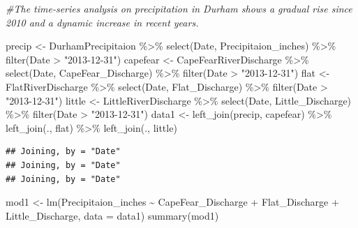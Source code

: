 \documentclass[
  12pt,
]{article}
\newenvironment{Shaded}{\begin{snugshade}}{\end{snugshade}}
\newcommand{\AttributeTok}[1]{\textcolor[rgb]{0.77,0.63,0.00}{#1}}
\newcommand{\CommentTok}[1]{\textcolor[rgb]{0.56,0.35,0.01}{\textit{#1}}}
\newcommand{\FunctionTok}[1]{\textcolor[rgb]{0.00,0.00,0.00}{#1}}
\newcommand{\NormalTok}[1]{#1}
\newcommand{\OtherTok}[1]{\textcolor[rgb]{0.56,0.35,0.01}{#1}}
\newcommand{\SpecialCharTok}[1]{\textcolor[rgb]{0.00,0.00,0.00}{#1}}
\newcommand{\StringTok}[1]{\textcolor[rgb]{0.31,0.60,0.02}{#1}}
\begin{document}
\begin{Shaded}
\begin{Highlighting}[]
\CommentTok{\#The time{-}series analysis on precipitation in Durham shows a gradual rise since 2010 and a dynamic increase in recent years. }
\end{Highlighting}
\end{Shaded}

\begin{Shaded}
\begin{Highlighting}[]
\NormalTok{precip }\OtherTok{\textless{}{-}}\NormalTok{ DurhamPrecipitaion }\SpecialCharTok{\%\textgreater{}\%}
  \FunctionTok{select}\NormalTok{(Date, Precipitaion\_inches) }\SpecialCharTok{\%\textgreater{}\%}
  \FunctionTok{filter}\NormalTok{(Date }\SpecialCharTok{\textgreater{}} \StringTok{"2013{-}12{-}31"}\NormalTok{)}
\NormalTok{capefear }\OtherTok{\textless{}{-}}\NormalTok{ CapeFearRiverDischarge }\SpecialCharTok{\%\textgreater{}\%}
  \FunctionTok{select}\NormalTok{(Date, CapeFear\_Discharge) }\SpecialCharTok{\%\textgreater{}\%}
  \FunctionTok{filter}\NormalTok{(Date }\SpecialCharTok{\textgreater{}} \StringTok{"2013{-}12{-}31"}\NormalTok{)}
\NormalTok{flat }\OtherTok{\textless{}{-}}\NormalTok{ FlatRiverDischarge }\SpecialCharTok{\%\textgreater{}\%}
  \FunctionTok{select}\NormalTok{(Date, Flat\_Discharge) }\SpecialCharTok{\%\textgreater{}\%}
  \FunctionTok{filter}\NormalTok{(Date }\SpecialCharTok{\textgreater{}} \StringTok{"2013{-}12{-}31"}\NormalTok{)}
\NormalTok{little }\OtherTok{\textless{}{-}}\NormalTok{ LittleRiverDischarge }\SpecialCharTok{\%\textgreater{}\%}
  \FunctionTok{select}\NormalTok{(Date, Little\_Discharge) }\SpecialCharTok{\%\textgreater{}\%}
  \FunctionTok{filter}\NormalTok{(Date }\SpecialCharTok{\textgreater{}} \StringTok{"2013{-}12{-}31"}\NormalTok{)}
\NormalTok{data1 }\OtherTok{\textless{}{-}} \FunctionTok{left\_join}\NormalTok{(precip, capefear) }\SpecialCharTok{\%\textgreater{}\%}
  \FunctionTok{left\_join}\NormalTok{(., flat) }\SpecialCharTok{\%\textgreater{}\%}
  \FunctionTok{left\_join}\NormalTok{(., little) }
\end{Highlighting}
\end{Shaded}

\begin{verbatim}
## Joining, by = "Date"
## Joining, by = "Date"
## Joining, by = "Date"
\end{verbatim}

\begin{Shaded}
\begin{Highlighting}[]
\NormalTok{mod1 }\OtherTok{\textless{}{-}} \FunctionTok{lm}\NormalTok{(Precipitaion\_inches }\SpecialCharTok{\textasciitilde{}}\NormalTok{ CapeFear\_Discharge }\SpecialCharTok{+}\NormalTok{ Flat\_Discharge }\SpecialCharTok{+}\NormalTok{ Little\_Discharge, }\AttributeTok{data =}\NormalTok{ data1)}
\FunctionTok{summary}\NormalTok{(mod1)}
\end{Highlighting}
\end{Shaded}
\end{document}
